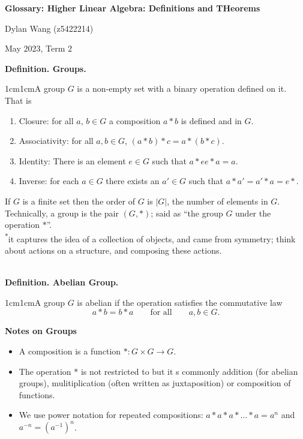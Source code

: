 \documentclass{article}
\newcommand{\definition}[2]{\textbf{Definition. #1.}\begin{adjustwidth}{1cm}{1cm}#2\end{adjustwidth}}
\begin{document}
\begin{titlepage}
    \centering
    \vspace*{\fill}

    \vspace*{0.5cm}

    \huge\bfseries
    Glossary: Higher Linear Algebra: Definitions and THeorems

    \vspace*{2cm}

    \large Dylan Wang (z5422214)

    \vspace*{2cm}

    \large May 2023, Term 2

    \vspace*{\fill}
\end{titlepage}
\newpage
\definition{Groups}{A group $G$ is a non-empty set with a binary operation defined on it. That is \begin{enumerate} \item Closure: for all $a$, $b \in G$ a composition $a * b$ is defined and in $G$.\item Associativity: for all $a,b \in G$, $(a*b)*c=a*(b*c)$. \item Identity: There is an element $e \in G$ such that $a * e e * a = a$. \item Inverse: for each $a \in G$ there exists an $a' \in G$ such that $a * a' = a' * a = e*.$ \end{enumerate}If $G$ is a finite set then the order of $G$ is $|G|$, the number of elements in $G$. Technically, a group is the pair $(G, *)$; said as ``the group $G$ under the operation $*$''.\\[1\baselineskip]\textsuperscript{*}it captures the idea of a collection of objects, and came from symmetry; think about actions on a structure, and composing these actions.}~\\
\definition{Abelian Group}{A group $G$ is abelian if the operation satisfies the commutative law \[a * b = b * a \qquad \text{for all} \qquad a,b \in G.\]}
\textbf{Notes on Groups}\begin{itemize}
  \item A composition is a function $*: G \times G \rightarrow G$.
  \item The operation $*$ is not restricted to but it s commonly addition (for abelian groups), mulitiplication (often written as juxtaposition) or composition of functions.
  \item We use power notation for repeated compositions: $a * a * a * \ldots * a = a^n$ and $a^{-n} = (a^{-1})^n$.
\end{itemize}
\end{document}
